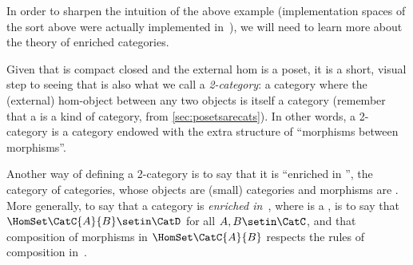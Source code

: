 In order to sharpen the intuition of the above example (implementation spaces of the sort above were actually implemented in~\cite{censi}), we will need to learn more about the theory of enriched categories.

Given that \DP is compact closed and the external hom is a poset, it is a short, visual step to seeing that \DP is also what we call a \emph{2-category}: a category where the (external) hom-object between any two objects is itself a category (remember that a  is a kind of category, from \cref{sec:posetsarecats}).
In other words, a 2-category is a category endowed with the extra structure of ``morphisms between morphisms''.

Another way of defining a 2-category is to say that it is ``enriched in \Category'', the category of categories, whose objects are (small) categories and morphisms are .
More generally, to say that a category \CatC is \emph{enriched in~\CatD}, where \CatD is a , is to say that $\HomSet\CatC{A}{B} \setin \CatD$ for all $A,B \setin \CatC$, and that composition of morphisms in $\HomSet\CatC{A}{B}$ respects the rules of composition in~\CatD.

